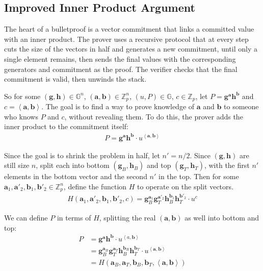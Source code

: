 \documentclass{article}
\begin{document}
\subsection{Improved Inner Product Argument}

The heart of a bulletproof is a vector commitment that links a committed value with an inner product.  The prover uses a recursive protocol that at every step cuts the size of the vectors in half and generates a new commitment, until only a single element remains, then sends the final values with the corresponding generators and commitment as the proof.  The verifier checks that the final commitment is valid, then unwinds the stack.

So for some $(\textbf{g}, \textbf{h}) \in \mathbb{G}^n$, $(\textbf{a}, \textbf{b}) \in \mathbb{Z}_p^n$, $(u, P) \in \mathbb{G}$, $c \in \mathbb{Z}_p$, let $P = \textbf{g}^\textbf{a} \textbf{h}^\textbf{b}$ and $c = \left<\textbf{a}, \textbf{b}\right>$.  The goal is to find a way to prove knowledge of $\textbf{a}$ and $\textbf{b}$ to someone who knows $P$ and $c$, without revealing them.  To do this, the prover adds the inner product to the commitment itself:
\begin{align}
  P = \textbf{g}^\textbf{a} \textbf{h}^\textbf{b} \cdot u^{\left<\textbf{a}, \textbf{b}\right>}
\end{align}

Since the goal is to shrink the problem in half, let $n' = n/2$.  Since $(\textbf{g}, \textbf{h})$ are still size $n$, split each into bottom $(\textbf{g}_{B}, \textbf{h}_{B})$ and top $(\textbf{g}_{T}, \textbf{h}_{T})$, with the first $n'$ elements in the bottom vector and the second $n'$ in the top.  Then for some $\textbf{a}_1, \textbf{a}'_2, \textbf{b}_1, \textbf{b}'_2 \in \mathbb{Z}_p^n$, define the function $H$ to operate on the split vectors. 
\begin{align}
  H(\textbf{a}_1, \textbf{a}'_2, \textbf{b}_1, \textbf{b}'_2, c) = \textbf{g}_{B}^{\textbf{a}_1} \textbf{g}_{T}^{\textbf{a}'_2} \textbf{h}_{B}^{\textbf{b}_1} \textbf{h}_{T}^{\textbf{b}'_2} \cdot u^c
\end{align}

We can define $P$ in terms of $H$, splitting the real $(\textbf{a}, \textbf{b})$ as well into bottom and top:
\begin{align}
  P &= \textbf{g}^{\textbf{a}} \textbf{h}^{\textbf{b}} \cdot u^{\left<a, \textbf{b}\right>}\\
    &= \textbf{g}_{B}^{\textbf{a}_{B}} \textbf{g}_{T}^{\textbf{a}_{T}} \textbf{h}_{B}^{\textbf{b}_{B}} \textbf{h}_{T}^{\textbf{b}_{T}} \cdot u^{\left<\textbf{a}, \textbf{b}\right>}\\
    &= H(\textbf{a}_{B}, \textbf{a}_{T}, \textbf{b}_{B}, \textbf{b}_{T}, \left<\textbf{a}, \textbf{b}\right>)
\end{align}
\end{document}

